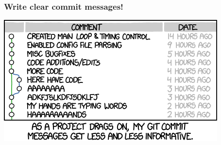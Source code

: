 \documentclass{beamer}
\begin{document}

\begin{frame}[fragile]
\frametitle{Write clear commit messages!}
\includegraphics[width=\textwidth]{git_commit.png}
\end{frame}
\end{document}
